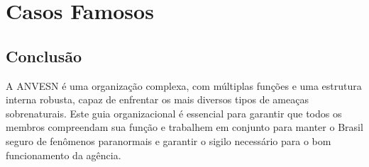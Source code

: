 \documentclass{book}
\begin{document}



\part{Casos Famosos}


\backmatter
\chapter*{Conclusão}
A ANVESN é uma organização complexa, com múltiplas funções e uma estrutura interna robusta, capaz de enfrentar os mais diversos tipos de ameaças sobrenaturais. Este guia organizacional é essencial para garantir que todos os membros compreendam sua função e trabalhem em conjunto para manter o Brasil seguro de fenômenos paranormais e garantir o sigilo necessário para o bom funcionamento da agência.
\end{document}
